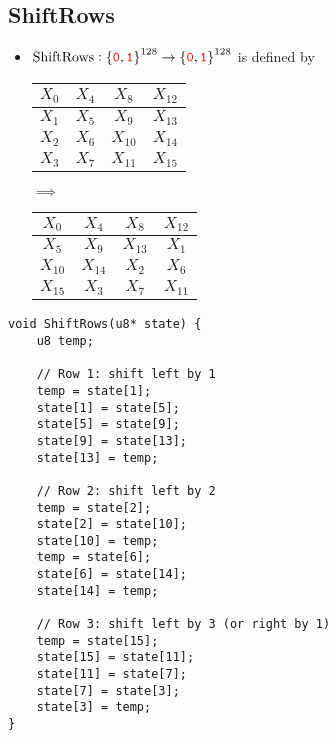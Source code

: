 \subsection{ShiftRows}
\begin{itemize}
	\item $\text{ShiftRows}:\set{\textcolor{red}{\texttt{0}},\textcolor{red}{\texttt{1}}}^{128}\to\set{\textcolor{red}{\texttt{0}},\textcolor{red}{\texttt{1}}}^{128}$ is defined by
	\begin{center}
	\begin{minipage}{.4\textwidth}\centering
		\begin{tabular}{|c|c|c|c|}
			\hline
			\cellcolor{red!20}$X_0$ & \cellcolor{red!20}$X_4$ & \cellcolor{red!20}$X_8$ & \cellcolor{red!20}$X_{12}$ \\ \hline
			\cellcolor{green!20}$X_1$ & \cellcolor{blue!20}$X_5$ & \cellcolor{blue!20}$X_9$ & \cellcolor{blue!20}$X_{13}$ \\ \hline
			\cellcolor{green!20}$X_2$ & \cellcolor{green!20}$X_6$ & \cellcolor{blue!20}$X_{10}$ & \cellcolor{blue!20}$X_{14}$ \\ \hline
			\cellcolor{green!20}$X_3$ & \cellcolor{green!20}$X_7$ & \cellcolor{green!20}$X_{11}$ & \cellcolor{blue!20}$X_{15}$ \\ \hline
		\end{tabular}
	\end{minipage}$\implies$\begin{minipage}{.4\textwidth}\centering
	\begin{tabular}{|c|c|c|c|}
		\hline
		\cellcolor{red!20}$X_0$ & \cellcolor{red!20}$X_4$ & \cellcolor{red!20}$X_8$ & \cellcolor{red!20}$X_{12}$ \\ \hline
		\cellcolor{blue!20}$X_5$ & \cellcolor{blue!20}$X_9$ & \cellcolor{blue!20}$X_{13}$ & \cellcolor{green!20}$X_1$ \\ \hline
		\cellcolor{blue!20}$X_{10}$ & \cellcolor{blue!20}$X_{14}$ & \cellcolor{green!20}$X_2$ & \cellcolor{green!20}$X_6$ \\ \hline
		\cellcolor{blue!20}$X_{15}$ & \cellcolor{green!20}$X_3$ & \cellcolor{green!20}$X_7$ & \cellcolor{green!20}$X_{11}$ \\ \hline
	\end{tabular}
\end{minipage}
	\end{center}
\end{itemize}

\begin{lstlisting}[style=C, caption={ShiftRows},captionpos=t]
void ShiftRows(u8* state) {
	u8 temp;
	
	// Row 1: shift left by 1
	temp = state[1];
	state[1] = state[5];
	state[5] = state[9];
	state[9] = state[13];
	state[13] = temp;
	
	// Row 2: shift left by 2
	temp = state[2];
	state[2] = state[10];
	state[10] = temp;
	temp = state[6];
	state[6] = state[14];
	state[14] = temp;
	
	// Row 3: shift left by 3 (or right by 1)
	temp = state[15];
	state[15] = state[11];
	state[11] = state[7];
	state[7] = state[3];
	state[3] = temp;
}
\end{lstlisting}

